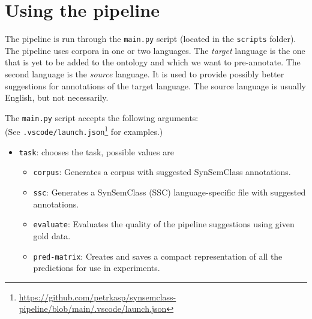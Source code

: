 \chapter{Using the pipeline}
\label{user_doc}

The pipeline is run through the \texttt{main.py} script (located in the \texttt{scripts} folder). The pipeline uses corpora in one or two languages. The \textit{target} language is the one that is yet to be added to the ontology and which we want to pre-annotate. The second language is the \textit{source} language. It is used to provide possibly better suggestions for annotations of the target language. The source language is usually English, but not necessarily. \vspace{0.8em}

\noindent
The \texttt{main.py} script accepts the following arguments: \\ (See \texttt{.vscode/launch.json}\footnote{\url{https://github.com/petrkasp/synsemclass-pipeline/blob/main/.vscode/launch.json}} for examples.)

\begin{itemize}
    \item \texttt{task}: chooses the task, possible values are
    \begin{itemize}
        \item \texttt{corpus}: Generates a corpus with suggested SynSemClass annotations.
        \item \texttt{ssc}: Generates a SynSemClass (SSC) language-specific file with suggested annotations. 
        \item \texttt{evaluate}: Evaluates the quality of the pipeline suggestions using given gold data.
        \item \texttt{pred-matrix}: Creates and saves a compact representation of all the predictions for use in experiments.
    \end{itemize}
\end{itemize}


